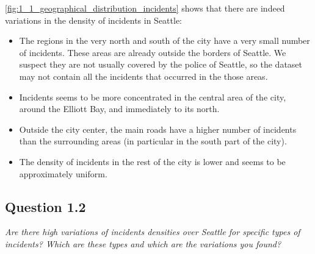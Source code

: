 \cref{fig:1_1_geographical_distribution_incidents} shows that there are indeed variations in the density of incidents in Seattle:
\begin{itemize}
    \item The regions in the very north and south of the city have a very small number of incidents. These areas are already outside the borders of Seattle. We suspect they are not usually covered by the police of Seattle, so the dataset may not contain all the incidents that occurred in the those areas.
    \item Incidents seems to be more concentrated in the central area of the city, around the Elliott Bay, and immediately to its north.
    \item Outside the city center, the main roads have a higher number of incidents than the surrounding areas (in particular in the south part of the city).
    \item The density of incidents in the rest of the city is lower and seems to be approximately uniform.
\end{itemize}

\subsection*{Question 1.2}
\textit{Are there high variations of incidents densities over Seattle for specific types of incidents? Which are these types and which are the variations you found?}
